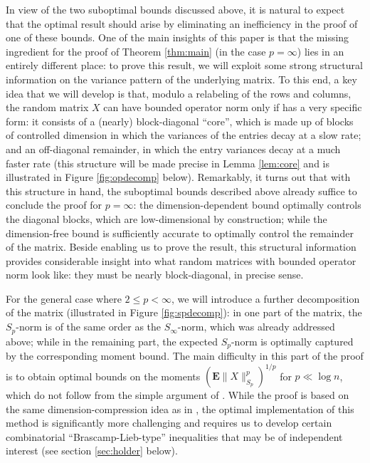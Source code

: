 \documentclass[10pt,reqno]{amsart}
\theoremstyle{definition}
\numberwithin{equation}{section}
\numberwithin{figure}{section}
\numberwithin{table}{section}
\begin{document}
In view of the two suboptimal bounds discussed above, it is natural to 
expect that the optimal result should arise by eliminating an inefficiency 
in the proof of one of these bounds. One of the main insights of this 
paper is that the missing ingredient for the proof of Theorem 
\ref{thm:main} (in the case $p=\infty$) lies in an entirely different 
place: to prove this result, we will exploit some strong structural 
information on the variance pattern of the underlying matrix. To this end, 
a key idea that we will develop is that, modulo a relabeling of the rows 
and columns, the random matrix $X$ can have bounded operator norm only if 
has a very specific form: it consists of a (nearly) block-diagonal 
``core'', which is made up of blocks of controlled dimension in which the 
variances of the entries decay at a slow rate; and an off-diagonal 
remainder, in which the entry variances decay at a much faster rate (this 
structure will be made precise in Lemma \ref{lem:core} and is illustrated 
in Figure \ref{fig:opdecomp} below). Remarkably, it turns out that with 
this structure in hand, the suboptimal bounds described above already 
suffice to conclude the proof for $p=\infty$: the dimension-dependent 
bound optimally controls the diagonal blocks, which are low-dimensional by 
construction; while the dimension-free bound is sufficiently accurate to 
optimally control the remainder of the matrix. Beside enabling us to prove 
the result, this structural information provides considerable insight into 
what random matrices with bounded operator norm look like: they must be 
nearly block-diagonal, in precise sense.

For the general case where $2\le p<\infty$, we will introduce a further 
decomposition of the matrix (illustrated in Figure \ref{fig:spdecomp}): in 
one part of the matrix, the $S_p$-norm is of the same order as the 
$S_\infty$-norm, which was already addressed above; while in the remaining 
part, the expected $S_p$-norm is optimally captured by the corresponding 
moment bound. The main difficulty in this part of the proof is to obtain 
optimal bounds on the moments $(\mathbf{E}\|X\|_{S_p}^p)^{1/p}$ for 
$p\ll\log n$, which do not follow from the simple argument of 
\cite{BvH16}. While the proof is based on the same dimension-compression 
idea as in \cite{BvH16}, the optimal implementation of this method is 
significantly more challenging and requires us to develop certain 
combinatorial ``Brascamp-Lieb-type'' inequalities that may be of 
independent interest (see section \ref{sec:holder} below).
\end{document}
